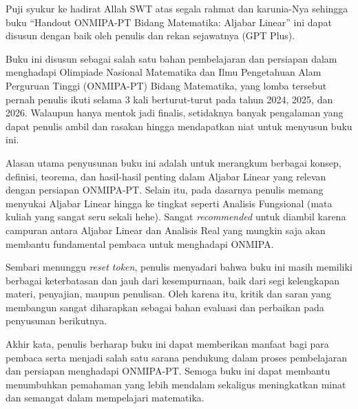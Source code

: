 Puji syukur ke hadirat Allah SWT atas segala rahmat dan karunia-Nya sehingga buku ``Handout ONMIPA-PT Bidang Matematika: Aljabar Linear'' ini dapat disusun dengan baik oleh penulis dan rekan sejawatnya (GPT Plus).

Buku ini disusun sebagai salah satu bahan pembelajaran dan persiapan dalam menghadapi Olimpiade Nasional Matematika dan Ilmu Pengetahuan Alam Perguruan Tinggi (ONMIPA-PT) Bidang Matematika, yang lomba tersebut pernah penulis ikuti selama 3 kali berturut-turut pada tahun 2024, 2025, dan 2026. Walaupun hanya mentok jadi finalis, setidaknya banyak pengalaman yang dapat penulis ambil dan rasakan hingga mendapatkan niat untuk menyusun buku ini.

Alasan utama penyusunan buku ini adalah untuk merangkum berbagai konsep, definisi, teorema, dan hasil-hasil penting dalam Aljabar Linear yang relevan dengan persiapan ONMIPA-PT. Selain itu, pada dasarnya penulis memang menyukai Aljabar Linear hingga ke tingkat seperti Analisis Fungsional (mata kuliah yang sangat seru sekali hehe). Sangat \textit{recommended} untuk diambil karena campuran antara Aljabar Linear dan Analisis Real yang mungkin saja akan membantu fundamental pembaca untuk menghadapi ONMIPA.

Sembari menunggu \textit{reset token}, penulis menyadari bahwa buku ini masih memiliki berbagai keterbatasan dan jauh dari kesempurnaan, baik dari segi kelengkapan materi, penyajian, maupun penulisan. Oleh karena itu, kritik dan saran yang membangun sangat diharapkan sebagai bahan evaluasi dan perbaikan pada penyusunan berikutnya.

Akhir kata, penulis berharap buku ini dapat memberikan manfaat bagi para pembaca serta menjadi salah satu sarana pendukung dalam proses pembelajaran dan persiapan menghadapi ONMIPA-PT. Semoga buku ini dapat membantu menumbuhkan pemahaman yang lebih mendalam sekaligus meningkatkan minat dan semangat dalam mempelajari matematika.
